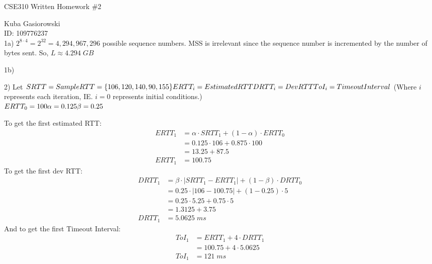 \documentclass[12pt]{report}
\begin{document}
\Large
\centering
CSE310 Written Homework \#2

\justify
\normalsize

Kuba Gasiorowski\\
ID: 109776237\\

\noindent{}1a) $2^{8\cdot4} = 2^{32} = 4,294,967,296$ possible sequence numbers. MSS is irrelevant since the sequence number is incremented by the number of bytes sent. So, $\boxed{L\approx4.294\;GB}$

\bigskip

\noindent{}1b)

\bigskip

\noindent{}2)
Let $SRTT = SampleRTT = \{106, 120, 140, 90, 155\}\\\\
ERTT_i = EstimatedRTT\\
DRTT_i = DevRTT\\
ToI_i = TimeoutInterval\\
$
(Where $i$ represents each iteration, IE. $i=0$ represents initial conditions.)\\

\noindent$ERTT_0 = 100\\
\alpha = 0.125\\
\beta = 0.25\\$

\noindent
To get the first estimated RTT:
\begin{align*}
ERTT_1 &= \alpha \cdot SRTT_1 + (1-\alpha)\cdot ERTT_0\\
&= 0.125 \cdot 106 + 0.875 \cdot 100\\
&= 13.25 + 87.5\\
ERTT_1 &= \boxed{100.75}
\end{align*}
\noindent
To get the first dev RTT:
\begin{align*}
DRTT_1 &= \beta \cdot \lvert SRTT_1 - ERTT_1 \rvert + (1-\beta) \cdot DRTT_0 \\
&= 0.25 \cdot \lvert 106 - 100.75 \rvert + (1 - 0.25) \cdot 5 \\
&= 0.25 \cdot 5.25 + 0.75 \cdot 5 \\
&= 1.3125 + 3.75\\
DRTT_1 &= \boxed{5.0625\;ms} 
\end{align*}
\noindent
And to get the first Timeout Interval:
\begin{align*}
ToI_1 &= ERTT_1 + 4 \cdot DRTT_1\\
&= 100.75 + 4 \cdot 5.0625\\
ToI_1 &= \boxed{121\;ms}
\end{align*}
\end{document}
